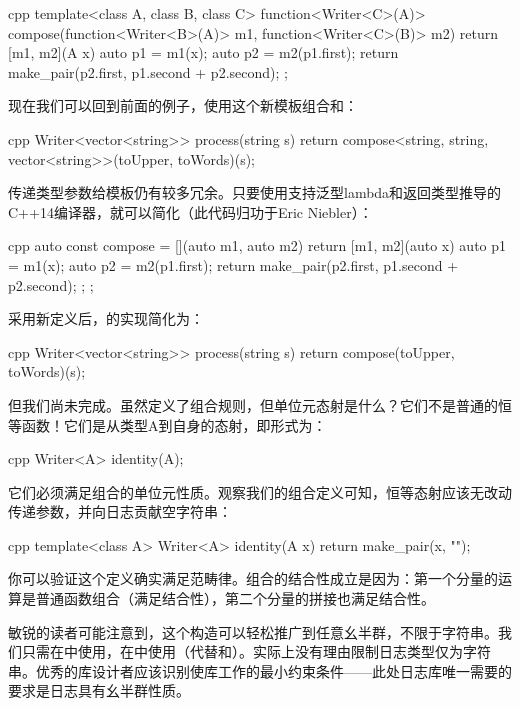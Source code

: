 \begin{snip}{cpp}
template<class A, class B, class C>
function<Writer<C>(A)> compose(function<Writer<B>(A)> m1,
                               function<Writer<C>(B)> m2)
{
    return [m1, m2](A x) {
        auto p1 = m1(x);
        auto p2 = m2(p1.first);
        return make_pair(p2.first, p1.second + p2.second); 
    };
}
\end{snip}
现在我们可以回到前面的例子，使用这个新模板组合和：

\begin{snip}{cpp}
Writer<vector<string>> process(string s) { 
    return compose<string, string, vector<string>>(toUpper, toWords)(s);
}
\end{snip}
传递类型参数给模板仍有较多冗余。只要使用支持泛型lambda和返回类型推导的C++14编译器，就可以简化（此代码归功于Eric Niebler）：

\begin{snip}{cpp}
auto const compose = [](auto m1, auto m2) { 
    return [m1, m2](auto x) { 
        auto p1 = m1(x);
        auto p2 = m2(p1.first);
        return make_pair(p2.first, p1.second + p2.second);
    };
};
\end{snip}
采用新定义后，的实现简化为：

\begin{snip}{cpp}
Writer<vector<string>> process(string s) {
    return compose(toUpper, toWords)(s);
}
\end{snip}
但我们尚未完成。虽然定义了组合规则，但单位元态射是什么？它们不是普通的恒等函数！它们是从类型A到自身的态射，即形式为：

\begin{snip}{cpp}
Writer<A> identity(A);
\end{snip}
它们必须满足组合的单位元性质。观察我们的组合定义可知，恒等态射应该无改动传递参数，并向日志贡献空字符串：

\begin{snip}{cpp}
template<class A> Writer<A> identity(A x) {
    return make_pair(x, "");
}
\end{snip}
你可以验证这个定义确实满足范畴律。组合的结合性成立是因为：第一个分量的运算是普通函数组合（满足结合性），第二个分量的拼接也满足结合性。

敏锐的读者可能注意到，这个构造可以轻松推广到任意幺半群，不限于字符串。我们只需在中使用，在中使用（代替\code{+}和）。实际上没有理由限制日志类型仅为字符串。优秀的库设计者应该识别使库工作的最小约束条件——此处日志库唯一需要的要求是日志具有幺半群性质。

